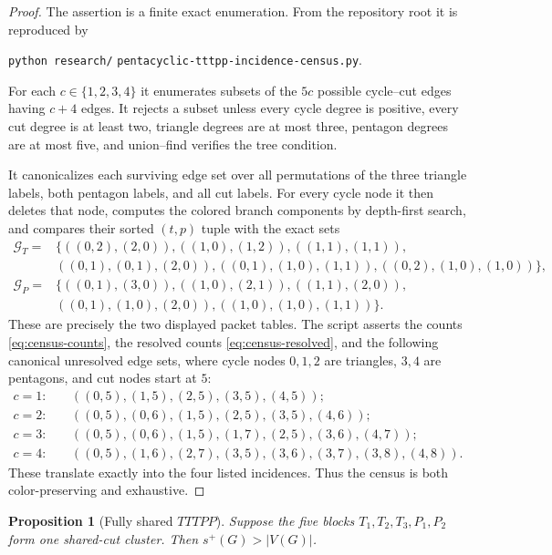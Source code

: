 \documentclass[11pt]{article}
\newtheorem{proposition}[theorem]{Proposition}
\newcommand{\spE}{s^+}
\begin{document}
\begin{proof}
The assertion is a finite exact enumeration.  From the repository root it is
reproduced by
\begin{center}
\texttt{python research/}\allowbreak
\texttt{pentacyclic-tttpp-incidence-census.py}.
\end{center}
For each
$c\in\{1,2,3,4\}$ it enumerates subsets of the $5c$ possible cycle--cut edges
having $c+4$ edges.  It rejects a subset unless every cycle degree is positive,
every cut degree is at least two, triangle degrees are at most three, pentagon
degrees are at most five, and union--find verifies the tree condition.

It canonicalizes each surviving edge set over all permutations of the three
triangle labels, both pentagon labels, and all cut labels.  For every cycle
node it then deletes that node, computes the colored branch components by
depth-first search, and compares their sorted $(t,p)$ tuple with the exact
sets
\begin{align*}
 \mathcal G_T={}&\{((0,2),(2,0)),((1,0),(1,2)),((1,1),(1,1)),\\
 &((0,1),(0,1),(2,0)),((0,1),(1,0),(1,1)),
 ((0,2),(1,0),(1,0))\},\\
 \mathcal G_P={}&\{((0,1),(3,0)),((1,0),(2,1)),((1,1),(2,0)),\\
 &((0,1),(1,0),(2,0)),((1,0),(1,0),(1,1))\}.
\end{align*}
These are precisely the two displayed packet tables.  The script asserts the
counts \eqref{eq:census-counts}, the resolved counts
\eqref{eq:census-resolved}, and the following canonical unresolved edge sets,
where cycle nodes $0,1,2$ are triangles, $3,4$ are pentagons, and cut nodes
start at $5$:
\begin{align*}
 c=1:&\quad ((0,5),(1,5),(2,5),(3,5),(4,5));\\
 c=2:&\quad ((0,5),(0,6),(1,5),(2,5),(3,5),(4,6));\\
 c=3:&\quad ((0,5),(0,6),(1,5),(1,7),(2,5),(3,6),(4,7));\\
 c=4:&\quad ((0,5),(1,6),(2,7),(3,5),(3,6),(3,7),(3,8),(4,8)).
\end{align*}
These translate exactly into the four listed incidences.  Thus the census is
both color-preserving and exhaustive.
\end{proof}

\begin{proposition}[Fully shared $TTTPP$]\label{prop:shared-tttpp}
Suppose the five blocks $T_1,T_2,T_3,P_1,P_2$ form one shared-cut cluster.
Then $\spE(G)>|V(G)|$.
\end{proposition}
\end{document}
